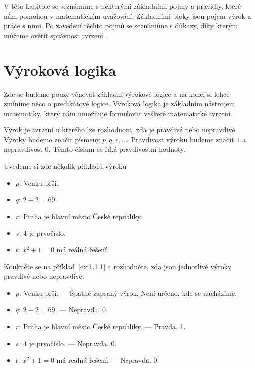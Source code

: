 


V této kapitole se seznámíme s některými základními pojmy a pravidly, které nám pomohou v matematickém uvažování. Základními bloky jsou pojem výrok a práce s nimi. Po zavedení těchto pojmů se seznámíme s důkazy, díky kterým můžeme ověřit správnost tvrzení.

\section{Výroková logika}

Zde se budeme pouze věnovat základní výrokové logice a na konci si lehce zmíníme něco o predikátové logice. Výroková logika je základním nástrojem matematiky, který nám umožňuje formulovat veškeré matematické tvrzení.

\begin{definitionbox}
  Výrok je tvrzení u kterého lze rozhodnout, zda je pravdivé nebo nepravdivé. Výroky budeme značit písmeny $p, q, r, \ldots$. Pravdivost výroku budeme značit $1$ a nepravdivost $0$. Těmto číslům se říká pravdivostní hodnoty.
\end{definitionbox}
\begin{example}
  Uvedeme si zde několik příkladů výroků:
  \begin{itemize}
    \item $p$: Venku prší.
    \item $q$: $2 + 2 = 69$.
    \item $r$: Praha je hlavní město České republiky.
    \item $s$: $4$ je prvočíslo.
    \item $t$: $x^2 + 1 = 0$ má reálná řešení.
  \end{itemize}
\end{example}

\begin{problem}
  Koukněte se na příklad~\ref{ex:1.1.1} a rozhodněte, zda jsou jednotlivé výroky pravdivé nebo nepravdivé.
\end{problem}

\begin{solution}
  \begin{itemize}
    \item $p$: Venku prší. --- Špatně zapsaný výrok. Není určeno, kde se nacházíme.
    \item $q$: $2 + 2 = 69$. --- Nepravda. 0.
    \item $r$: Praha je hlavní město České republiky. --- Pravda. 1.
    \item $s$: $4$ je prvočíslo. --- Nepravda. 0.
    \item $t$: $x^2 + 1 = 0$ má reálná řešení. --- Nepravda. 0.
  \end{itemize}
\end{solution}

